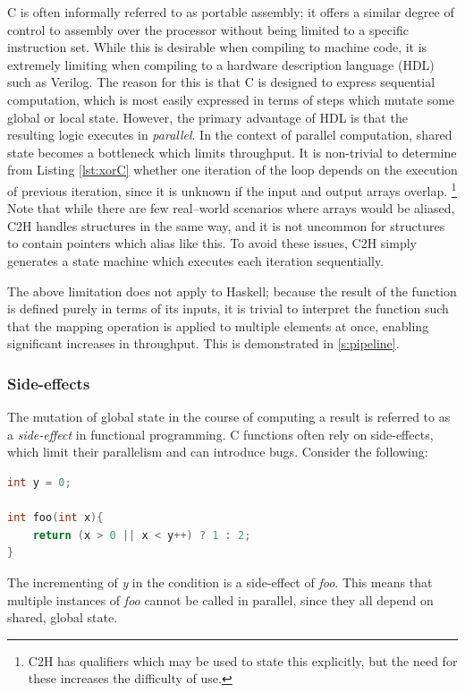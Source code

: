 \documentclass[english,onecolumn]{article}
\begin{document}
C is often informally referred to as portable assembly; it offers a similar degree of control to assembly over the processor without being limited to a specific instruction set. While this is desirable when compiling to machine code, it is extremely limiting when compiling to a hardware description language (HDL) such as Verilog.
The reason for this is that C is designed to express sequential computation, which is most easily expressed in terms of steps which mutate some global or local state. However, the primary advantage of HDL is that the resulting logic executes in \textit{parallel}. In the context of parallel computation, shared state becomes a bottleneck which limits throughput.
It is non-trivial to determine from Listing \ref{lst:xorC} whether one iteration of the loop depends on the execution of previous iteration, since it is unknown if the input and output arrays overlap.%
\footnote{C2H has qualifiers \cite[72]{C2H_UG} which may be used to state this explicitly, but the need for these increases the difficulty of use.}
Note that while there are few real--world scenarios where arrays would be aliased, C2H handles structures in the same way, \cite[54]{C2H_UG} and it is not uncommon for structures to contain pointers which alias like this.
To avoid these issues, C2H simply generates a state machine which executes each iteration sequentially.\cite[17]{C2H_UG}

The above limitation does not apply to Haskell; because the result of the function is defined purely in terms of its inputs, it is trivial to interpret the function such that the mapping operation is applied to multiple elements at once, enabling significant increases in throughput.
This is demonstrated in \ref{s:pipeline}.

\subsubsection{Side-effects}
The mutation of global state in the course of computing a result is referred to as a \textit{side-effect} in functional programming. C functions often rely on side-effects, which limit their parallelism and can introduce bugs. Consider the following:
\begin{lstlisting}[language=C, label={lst:side-effect}]
int y = 0;

int foo(int x){
    return (x > 0 || x < y++) ? 1 : 2;
}
\end{lstlisting}

The incrementing of \textit{y} in the condition is a side-effect of \textit{foo}. This means that multiple instances of \textit{foo} cannot be called in parallel, since they all depend on shared, global state.
\end{document}
